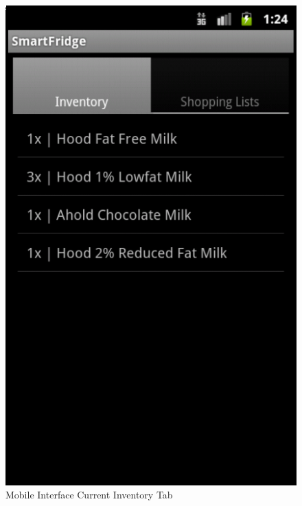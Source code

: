 \documentclass[11pt]{article} %
\begin{document}
\begin{figure}[h!]
\vspace{0.5cm}
\begin{center}
\includegraphics[scale=0.35]{../graphics/mobile_inventory}
\caption{Mobile Interface Current Inventory Tab}
\label{mob1}
\end{center}
\end{figure}
\end{document}
